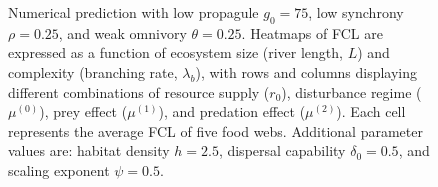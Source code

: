 \begin{figure}
\centering
{}
\caption{\label{fig:fig-num1}Numerical prediction with low propagule
\(g_0 = 75\), low synchrony \(\rho = 0.25\), and weak omnivory
\(\theta = 0.25\). Heatmaps of FCL are expressed as a function of
ecosystem size (river length, \(L\)) and complexity (branching rate,
\(\lambda_b\)), with rows and columns displaying different combinations
of resource supply (\(r_0\)), disturbance regime (\(\mu^{(0)}\)), prey
effect (\(\mu^{(1)}\)), and predation effect (\(\mu^{(2)}\)). Each cell
represents the average FCL of five food webs. Additional parameter
values are: habitat density \(h=2.5\), dispersal capability
\(\delta_0=0.5\), and scaling exponent \(\psi=0.5\).}
\end{figure}

\newpage

